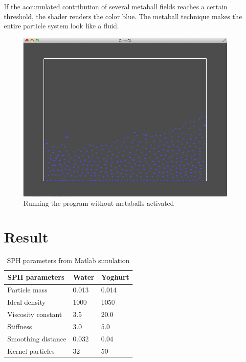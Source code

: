 \documentclass[a4paper,12pt,twoside,final]{report}
\begin{document}
\noindent  If the accumulated contribution of several metaball fields reaches a certain threshold, the shader renders the color blue. The metaball technique makes the entire particle system look like a fluid.

\begin{figure}[H]
\begin{center}
    \includegraphics[width=11cm]{figs/image_2.png} 
\end{center}
\caption{Running the program without metaballs activated}
\label{model_block}
\end{figure}



\chapter{Result}

\begin{table}[h]
  \centering
  \caption{SPH parameters from Matlab simulation}
  \label{Matlab table}
    \begin{tabularx}{\textwidth}{| X | X | X |}
    \hline
    SPH parameters & Water & Yoghurt \\ \hline
    Particle mass & 0.013 & 0.014 \\ \hline
    Ideal density & 1000 & 1050 \\ \hline
    Viscosity constant & 3.5 & 20.0 \\ \hline
    Stiffness & 3.0 & 5.0 \\ \hline
    Smoothing distance & 0.032 & 0.04 \\ \hline
    Kernel particles  & 32 & 50 \\ \hline
    \end{tabularx}
\end{table}
\end{document}
